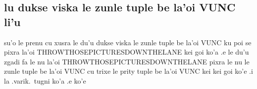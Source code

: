 \documentclass{report}
\begin{document}
\subsection{lu dukse viska le zunle tuple be la'oi VUNC li'u}
su'o le prenu cu xusra le du'u dukse viska le zunle tuple be la'oi VUNC ku poi se pixra la'oi THROWTHOSEPICTURESDOWNTHELANE kei goi ko'a .e le du'u zgadi fa le nu la'oi THROWTHOSEPICTURESDOWNTHELANE pixra le nu le zunle tuple be la'oi VUNC cu trixe le prity tuple be la'oi VUNC kei kei goi ko'e  .i la .varik.\ tugni ko'a .e ko'e
\end{document}
